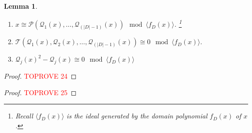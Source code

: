 \documentclass[11pt]{article}
\newcommand{\1}{\textbf{1}}
\newcommand{\T}{\mathcal{T}}
\newcommand\p{\mathcal{P}}
\newcommand\q{\mathcal{Q}}
\newcommand\uval{{(|D|-1)}}
\newtheorem{lemma}[theorem]{Lemma}
\begin{document}
\begin{lemma}\label{th:x}
    \begin{enumerate}
        \item $x \cong \p(\q_1(x),\ldots,\q_\uval(x)) \mod{\langle f_D(x)\rangle}$. \footnote{Recall $\langle f_D(x)\rangle$ is the ideal generated by the domain polynomial $f_D(x)$ of $x$.}
        \item $\T(\q_1(x), \q_2(x), \dots, \q_{\uval}(x)) \cong 0 \mod{\langle f_D(x)\rangle}.$
        \item $\q_{j}(x)^2 - \q_{j}(x) \cong 0 \mod{\langle f_D(x)\rangle}$
    \end{enumerate}
\end{lemma}
\begin{proof}\textcolor{red}{TOPROVE 24}\end{proof}

\begin{proof}\textcolor{red}{TOPROVE 25}\end{proof}
\end{document}

